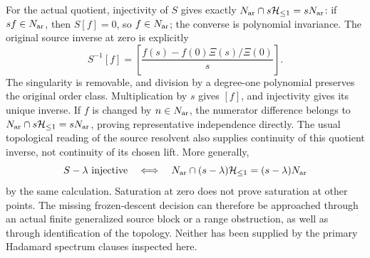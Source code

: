 For the actual quotient, injectivity of $S$ gives exactly
$N_{\rm ar}\cap s\mathcal H_{\leq 1}=sN_{\rm ar}$: if $sf\in N_{\rm ar}$, then
$S[f]=0$, so $f\in N_{\rm ar}$; the converse is polynomial invariance.
The original source inverse at zero is explicitly
\begin{equation}
 S^{-1}[f]=\left[
 \frac{f(s)-f(0)\Xi(s)/\Xi(0)}{s}\right].
 \label{csq:eq-source-explicit-zero-resolvent}
\end{equation}
The singularity is removable, and division by a degree-one
polynomial preserves the original order class. Multiplication
by $s$ gives $[f]$, and injectivity gives its unique inverse.
If $f$ is changed by $n\in N_{\rm ar}$, the numerator difference
belongs to $N_{\rm ar}\cap s\mathcal H_{\leq 1}=sN_{\rm ar}$, proving representative
independence directly. The usual topological reading of
the source resolvent also supplies continuity of this
quotient inverse, not continuity of its chosen lift.
More generally,
\[
 S-\lambda\text{ injective}\quad\Longleftrightarrow\quad
 N_{\rm ar}\cap(s-\lambda)\mathcal H_{\leq 1}=(s-\lambda)N_{\rm ar}
\]
by the same calculation. Saturation at zero does not prove
saturation at other points.
The missing frozen-descent decision can therefore be
approached through an actual finite generalized source block
or a range obstruction, as well as through identification
of the topology. Neither has been supplied by the primary
Hadamard spectrum clauses inspected here.

